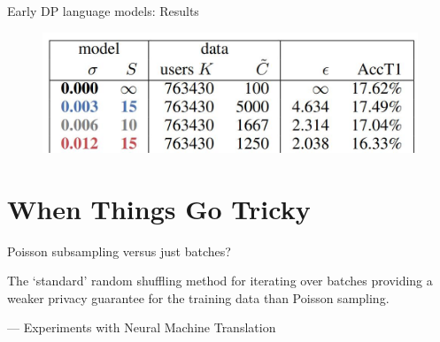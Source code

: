 \documentclass[12pt,aspectratio=169,handout]{beamer}
\begin{document}
\begin{frame}{Early DP language models: Results}

\begin{figure}
\includegraphics[width=0.8\linewidth]{img/mcmahan-table1.jpg}
\end{figure}


\end{frame}


\section{When Things Go Tricky}


\begin{frame}{Poisson subsampling versus just batches?}

The `standard' random shuffling method for iterating over batches providing a weaker privacy guarantee for the training data than Poisson sampling.

--- Experiments with Neural Machine Translation



\end{frame}
\end{document}
